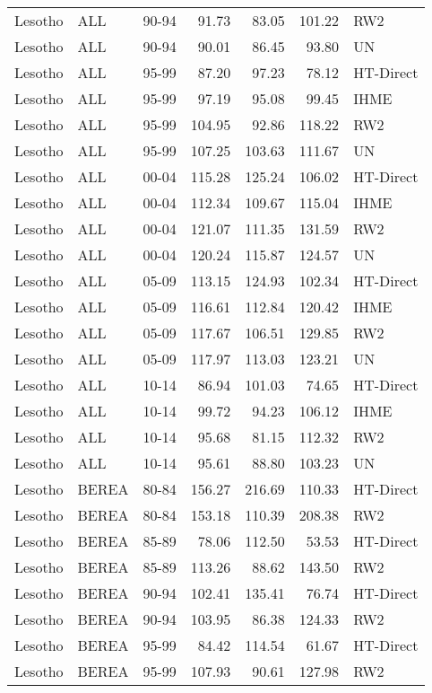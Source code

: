 \begin{longtable}{lllrrrl}
  Lesotho & ALL & 90-94 & 91.73 & 83.05 & 101.22 & RW2 \\ 
  Lesotho & ALL & 90-94 & 90.01 & 86.45 & 93.80 & UN \\ 
  Lesotho & ALL & 95-99 & 87.20 & 97.23 & 78.12 & HT-Direct \\ 
  Lesotho & ALL & 95-99 & 97.19 & 95.08 & 99.45 & IHME \\ 
  Lesotho & ALL & 95-99 & 104.95 & 92.86 & 118.22 & RW2 \\ 
  Lesotho & ALL & 95-99 & 107.25 & 103.63 & 111.67 & UN \\ 
  Lesotho & ALL & 00-04 & 115.28 & 125.24 & 106.02 & HT-Direct \\ 
  Lesotho & ALL & 00-04 & 112.34 & 109.67 & 115.04 & IHME \\ 
  Lesotho & ALL & 00-04 & 121.07 & 111.35 & 131.59 & RW2 \\ 
  Lesotho & ALL & 00-04 & 120.24 & 115.87 & 124.57 & UN \\ 
  Lesotho & ALL & 05-09 & 113.15 & 124.93 & 102.34 & HT-Direct \\ 
  Lesotho & ALL & 05-09 & 116.61 & 112.84 & 120.42 & IHME \\ 
  Lesotho & ALL & 05-09 & 117.67 & 106.51 & 129.85 & RW2 \\ 
  Lesotho & ALL & 05-09 & 117.97 & 113.03 & 123.21 & UN \\ 
  Lesotho & ALL & 10-14 & 86.94 & 101.03 & 74.65 & HT-Direct \\ 
  Lesotho & ALL & 10-14 & 99.72 & 94.23 & 106.12 & IHME \\ 
  Lesotho & ALL & 10-14 & 95.68 & 81.15 & 112.32 & RW2 \\ 
  Lesotho & ALL & 10-14 & 95.61 & 88.80 & 103.23 & UN \\ 
  Lesotho & BEREA & 80-84 & 156.27 & 216.69 & 110.33 & HT-Direct \\ 
  Lesotho & BEREA & 80-84 & 153.18 & 110.39 & 208.38 & RW2 \\ 
  Lesotho & BEREA & 85-89 & 78.06 & 112.50 & 53.53 & HT-Direct \\ 
  Lesotho & BEREA & 85-89 & 113.26 & 88.62 & 143.50 & RW2 \\ 
  Lesotho & BEREA & 90-94 & 102.41 & 135.41 & 76.74 & HT-Direct \\ 
  Lesotho & BEREA & 90-94 & 103.95 & 86.38 & 124.33 & RW2 \\ 
  Lesotho & BEREA & 95-99 & 84.42 & 114.54 & 61.67 & HT-Direct \\ 
  Lesotho & BEREA & 95-99 & 107.93 & 90.61 & 127.98 & RW2 \\ 

\end{longtable}
